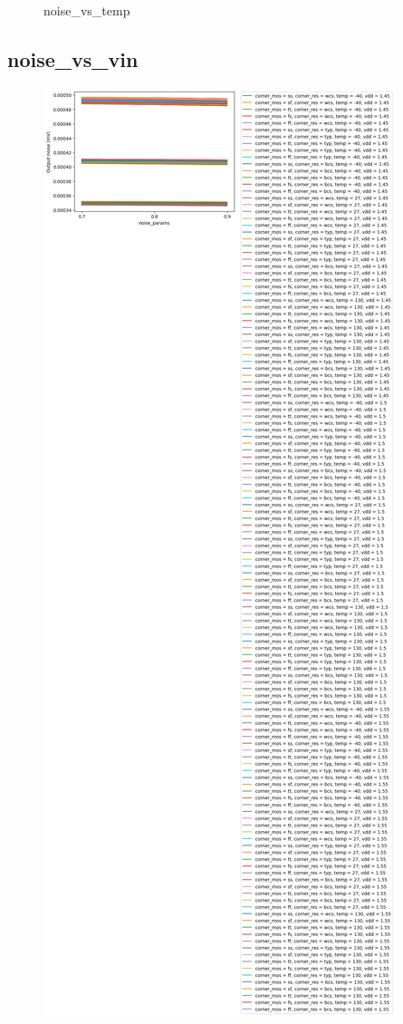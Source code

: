 \documentclass[
  a4paper,
  DIV=11,
  numbers=noendperiod]{scrartcl}
\begin{document}
\begin{tcolorbox}
\begin{figure}[H]
{}

\caption{noise\_vs\_temp}

\end{figure}%

\subsection*{noise\_vs\_vin}\label{noise_vs_vin-1}

\begin{figure}[H]

{\centering \includegraphics{./cace/_docs/ota-improved/schematic/noise_vs_vin.png}

}
\end{figure}
\end{tcolorbox}
\end{document}
